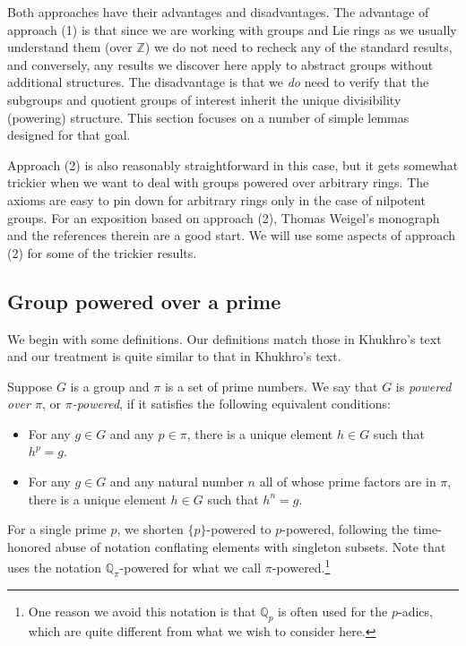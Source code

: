 Both approaches have their advantages and disadvantages. The advantage
of approach (1) is that since we are working with groups and Lie rings
as we usually understand them (over $\mathbb{Z}$) we do not need to
recheck any of the standard results, and conversely, any results we
discover here apply to abstract groups without additional
structures. The disadvantage is that we {\em do} need to verify that
the subgroups and quotient groups of interest inherit the unique
divisibility (powering) structure. This section focuses on a number of
simple lemmas designed for that goal.

Approach (2) is also reasonably straightforward in this case, but it
gets somewhat trickier when we want to deal with groups powered over
arbitrary rings. The axioms are easy to pin down for arbitrary rings
only in the case of nilpotent groups. For an exposition based on
approach (2), Thomas Weigel's monograph \cite{Weigel} and the
references therein are a good start. We will use some aspects of
approach (2) for some of the trickier results.

\subsection{Group powered over a prime}\label{sec:group-powering-def}

We begin with some definitions. Our definitions match those in
Khukhro's text \cite{Khukhro} and our treatment is quite similar to
that in Khukhro's text.

\begin{definer}\label{def:poweredgroup}
  Suppose $G$ is a group and $\pi$ is a set of prime numbers. We say
  that $G$ is {\em powered over $\pi$}, or {\em $\pi$-powered}, if it satisfies
  the following equivalent conditions:

  \begin{itemize}
  \item For any $g \in G$ and any $p \in
    \pi$, there is a unique element $h \in G$ such that $h^p = g$.
  \item For any $g \in G$ and any natural number $n$ all of whose
    prime factors are in $\pi$, there is a unique element $h \in G$
    such that $h^n = g$.
  \end{itemize}
\end{definer}

For a single prime $p$, we shorten $\{ p \}$-powered to $p$-powered,
following the time-honored abuse of notation conflating elements with
singleton subsets. Note that \cite{Khukhro} uses the notation
$\mathbb{Q}_\pi$-powered for what we call $\pi$-powered.\footnote{One
  reason we avoid this notation is that $\mathbb{Q}_p$ is often used
  for the $p$-adics, which are quite different from what we wish to
  consider here.}

